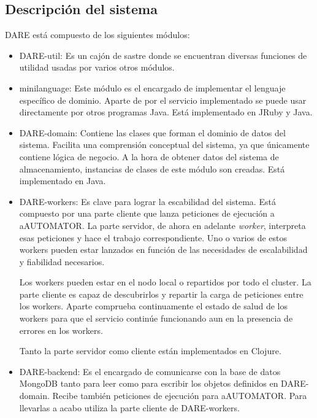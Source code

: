 \subsection{Descripción del sistema}

DARE está compuesto de los siguientes módulos:

\begin{itemize}

  \item DARE-util: Es un cajón de sastre donde se encuentran diversas
    funciones de utilidad usadas por varios otros módulos.

  \item minilanguage: Este módulo es el encargado de implementar el
    lenguaje específico de dominio. Aparte de por el servicio
    implementado se puede usar directamente por otros programas
    Java. Está implementado en JRuby y Java.

  \item DARE-domain: Contiene las clases que forman el dominio de
    datos del sistema. Facilita una comprensión conceptual del
    sistema, ya que únicamente contiene lógica de negocio. A la hora
    de obtener datos del sistema de almacenamiento, instancias de
    clases de este módulo son creadas. Está implementado en Java.

  \item DARE-workers: Es clave para lograr la escabilidad del
    sistema. Está compuesto por una parte cliente que lanza peticiones
    de ejecución a aAUTOMATOR. La parte servidor, de ahora en adelante
    \emph{worker}, interpreta esas peticiones y hace el trabajo
    correspondiente. Uno o varios de estos workers pueden estar
    lanzados en función de las necesidades de escalabilidad y
    fiabilidad necesarios.

    Los workers pueden estar en el nodo local o repartidos por todo el
    cluster. La parte cliente es capaz de descubrirlos y repartir la
    carga de peticiones entre los workers. Aparte comprueba
    continuamente el estado de salud de los workers para que el
    servicio continúe funcionando aun en la presencia de errores en
    los workers.

    Tanto la parte servidor como cliente están implementados en
    Clojure.

  \item DARE-backend: Es el encargado de comunicarse con la base de
    datos MongoDB tanto para leer como para escribir los objetos
    definidos en DARE-domain. Recibe también peticiones de ejecución
    para aAUTOMATOR. Para llevarlas a acabo utiliza la parte cliente
    de DARE-workers.


\end{itemize}
